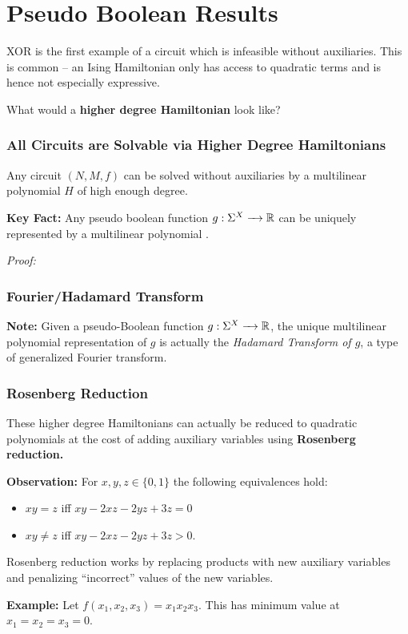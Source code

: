\documentclass[8pt, mathserif, notheorems]{beamer}
\begin{document}
\section{Pseudo Boolean Results}
\begin{frame}[t]
  XOR is the first example of a circuit which is infeasible without auxiliaries. This is common -- an Ising Hamiltonian only has access to quadratic terms and is hence not especially expressive.

  \bigskip

  What would a \textbf{higher degree Hamiltonian} look like?
\end{frame}
\begin{frame}[t]\frametitle{All Circuits are Solvable via Higher Degree Hamiltonians}
  \begin{prop}
    Any circuit $(N,M,f)$ can be solved without auxiliaries by a multilinear polynomial $H$ of high enough degree.
  \end{prop}

  \bigskip

  \textbf{Key Fact:} Any pseudo boolean function $g:\Sigma^X \to \bR$ can be uniquely represented by a multilinear polynomial \cite{boroshammer}.

  \bigskip

  \textit{Proof:}
\end{frame}
\begin{frame}[c]\frametitle{Fourier/Hadamard Transform}
  \textbf{Note:} Given a pseudo-Boolean function $g:\Sigma^X \to \bR$, the unique multilinear polynomial representation of $g$ is actually the \textit{Hadamard Transform of $g$}, a type of generalized Fourier transform.
\end{frame}
\begin{frame}[t]\frametitle{Rosenberg Reduction}
  These higher degree Hamiltonians can actually be reduced to quadratic polynomials at the cost of adding auxiliary variables using \textbf{Rosenberg reduction.}

  \bigskip

  \textbf{Observation:} For $x,y,z \in \{0,1\}$ the following equivalences hold:
  \begin{itemize}
    \item $xy = z$ iff $xy - 2xz - 2yz + 3z = 0$
    \item $xy \neq z$ iff $xy - 2xz - 2yz + 3z > 0$.
  \end{itemize}

  \bigskip

  Rosenberg reduction works by replacing products with new auxiliary variables and penalizing ``incorrect'' values of the new variables.

  \bigskip

  \textbf{Example:} Let $f(x_1,x_2,x_3) = x_1x_2x_3$. This has minimum value at $x_1 = x_2 = x_3 = 0$.
\end{frame}
\end{document}
